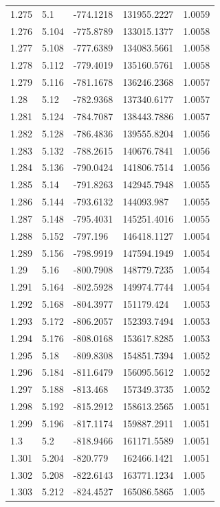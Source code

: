 \begin{tabular}{lllll}
1.275 & 5.1 & -774.1218 & 131955.2227 & 1.0059 \\
1.276 & 5.104 & -775.8789 & 133015.1377 & 1.0058 \\
1.277 & 5.108 & -777.6389 & 134083.5661 & 1.0058 \\
1.278 & 5.112 & -779.4019 & 135160.5761 & 1.0058 \\
1.279 & 5.116 & -781.1678 & 136246.2368 & 1.0057 \\
1.28 & 5.12 & -782.9368 & 137340.6177 & 1.0057 \\
1.281 & 5.124 & -784.7087 & 138443.7886 & 1.0057 \\
1.282 & 5.128 & -786.4836 & 139555.8204 & 1.0056 \\
1.283 & 5.132 & -788.2615 & 140676.7841 & 1.0056 \\
1.284 & 5.136 & -790.0424 & 141806.7514 & 1.0056 \\
1.285 & 5.14 & -791.8263 & 142945.7948 & 1.0055 \\
1.286 & 5.144 & -793.6132 & 144093.987 & 1.0055 \\
1.287 & 5.148 & -795.4031 & 145251.4016 & 1.0055 \\
1.288 & 5.152 & -797.196 & 146418.1127 & 1.0054 \\
1.289 & 5.156 & -798.9919 & 147594.1949 & 1.0054 \\
1.29 & 5.16 & -800.7908 & 148779.7235 & 1.0054 \\
1.291 & 5.164 & -802.5928 & 149974.7744 & 1.0054 \\
1.292 & 5.168 & -804.3977 & 151179.424 & 1.0053 \\
1.293 & 5.172 & -806.2057 & 152393.7494 & 1.0053 \\
1.294 & 5.176 & -808.0168 & 153617.8285 & 1.0053 \\
1.295 & 5.18 & -809.8308 & 154851.7394 & 1.0052 \\
1.296 & 5.184 & -811.6479 & 156095.5612 & 1.0052 \\
1.297 & 5.188 & -813.468 & 157349.3735 & 1.0052 \\
1.298 & 5.192 & -815.2912 & 158613.2565 & 1.0051 \\
1.299 & 5.196 & -817.1174 & 159887.2911 & 1.0051 \\
1.3 & 5.2 & -818.9466 & 161171.5589 & 1.0051 \\
1.301 & 5.204 & -820.779 & 162466.1421 & 1.0051 \\
1.302 & 5.208 & -822.6143 & 163771.1234 & 1.005 \\
1.303 & 5.212 & -824.4527 & 165086.5865 & 1.005 \\

\end{tabular}
